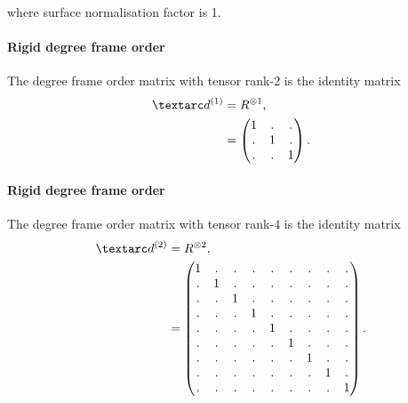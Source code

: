 where surface normalisation factor is 1.


\paragraph{Rigid  degree frame order}

The  degree frame order matrix with tensor rank-2 is the identity matrix
\begin{subequations} \label{eq: rigid 1st degree frame order matrix}
\begin{align}
    \FOone &= R^{\otimes 1} , \\
           &= \begin{pmatrix}
                  1 & . & . \\
                  . & 1 & . \\
                  . & . & 1 \\
              \end{pmatrix}.
\end{align}
\end{subequations}


\paragraph{Rigid  degree frame order}

The  degree frame order matrix with tensor rank-4 is the identity matrix
\begin{subequations} \label{eq: rigid 2nd degree frame order matrix}
\begin{align}
    \FOtwo &= R^{\otimes 2} , \\
           &= \begin{pmatrix}
                  1 & . & . & . & . & . & . & . & . \\
                  . & 1 & . & . & . & . & . & . & . \\
                  . & . & 1 & . & . & . & . & . & . \\
                  . & . & . & 1 & . & . & . & . & . \\
                  . & . & . & . & 1 & . & . & . & . \\
                  . & . & . & . & . & 1 & . & . & . \\
                  . & . & . & . & . & . & 1 & . & . \\
                  . & . & . & . & . & . & . & 1 & . \\
                  . & . & . & . & . & . & . & . & 1 \\
              \end{pmatrix}.
\end{align}
\end{subequations}



